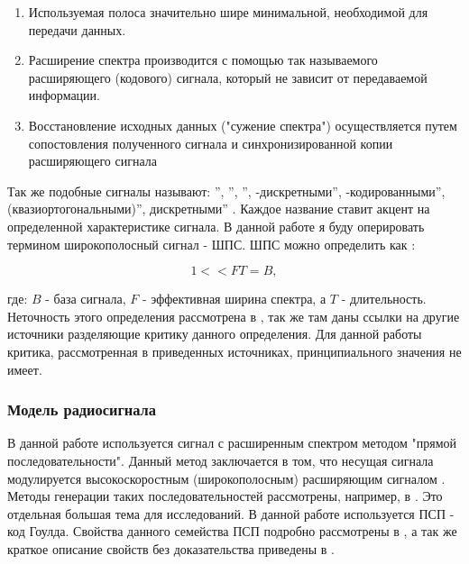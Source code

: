 \begin{enumerate}
	\item Используемая полоса значительно шире минимальной, необходимой для передачи данных.
	\item Расширение спектра производится с помощью так называемого расширяющего (кодового) сигнала,
		который не зависит от передаваемой информации.
	\item Восстановление исходных данных ("сужение спектра") осуществляется путем сопостовления полученного
		сигнала и синхронизированной копии расширяющего сигнала
\end{enumerate}
Так же подобные сигналы называют:
\textquotedblright,
\textquotedblright,
\textquotedblright,
-дискретными\textquotedblright,
-кодированными\textquotedblright,
 (квазиортогональными)\textquotedblright,
 дискретными\textquotedblright
\cite{gantmaher-book}.
Каждое название ставит акцент на определенной характеристике сигнала. В данной работе я буду оперировать термином
широкополосный сигнал - ШПС. ШПС можно определить как \cite{gantmaher-book, varakin-book}:

\begin{center}
\begin{equation}
	\label{eq:ss_signal}
	1 << FT = B,
\end{equation}
\end{center}
где: ${B}$ - база сигнала, ${F}$ - эффективная ширина спектра, а ${T}$ - длительность.
Неточность этого определения рассмотрена в \cite{gantmaher-book}, так же там даны ссылки на другие источники
разделяющие критику данного определения. Для данной работы критика, рассмотренная в приведенных источниках,
принципиального значения не имеет.

\subsubsection{Модель радиосигнала}
В данной работе используется сигнал с расширенным спектром методом "прямой последовательности". Данный метод
заключается в том, что несущая сигнала модулируется высокоскоростным (широкополосным) расширяющим сигналом \cite{sklyar}.
Методы генерации таких последовательностей рассмотрены, например, в \cite{gantmaher-book, pestryakov-book}. Это отдельная большая
тема для исследований. В данной работе используется ПСП - код Гоулда. Свойства данного семейства ПСП подробно рассмотрены в
\cite{gold-ieee}, а так же краткое описание свойств без доказательства приведены в \cite{tsui, akos-book}.

